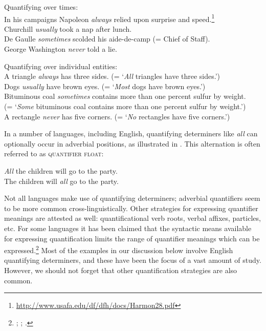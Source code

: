 \ea \label{ex:14.7}
Quantifying over times:\\
\ea In his campaigns Napoleon \textit{always} relied upon surprise and speed.\footnote{\url{http://www.usafa.edu/df/dfh/docs/Harmon28.pdf}} \\
\ex Churchill \textit{usually} took a nap after lunch.\\
\ex De Gaulle \textit{sometimes} scolded his aide-de-camp (= Chief of Staff).\\
\ex George Washington \textit{never} told a lie.
                       \z
\z

\ea \label{ex:14.8}
Quantifying over individual entities:\\
\ea A triangle \textit{always} has three sides. (= ‘\textit{All} triangles have three sides.’)\\
\ex Dogs \textit{usually} have brown eyes. (= ‘\textit{Most} dogs have brown eyes.’)\\
\ex Bituminous coal \textit{sometimes} contains more than one percent sulfur by weight.\\
  (= ‘\textit{Some} bituminous coal contains more than one percent sulfur by weight.’)\\
\ex A rectangle \textit{never} has five corners. (= ‘\textit{No} rectangles have five corners.’)
                       \z
\z


In a number of languages, including English, quantifying determiners like \textit{all} can optionally occur in adverbial positions, as illustrated in . This alternation is often referred to as \textsc{quantifier float}:


\ea \label{ex:14.9}
\ea \textit{All} the children will go to the party.\\
\ex The children will \textit{all} go to the party.
                       \z
\z


Not all languages make use of quantifying determiners; adverbial quantifiers seem to be more common cross-linguistically. Other strategies for expressing quantifier meanings are attested as well: quantificational verb roots, verbal affixes, particles, etc. For some languages it has been claimed that the syntactic means available for expressing quantification limits the range of quantifier meanings which can be expressed.\footnote{\citet{Baker1995}; \citet{Bittner1995}; \citet{KoenigMichelson2010}.} Most of the examples in our discussion below involve English quantifying determiners, and these have been the focus of a vast amount of study. However, we should not forget that other quantification strategies are also common.


